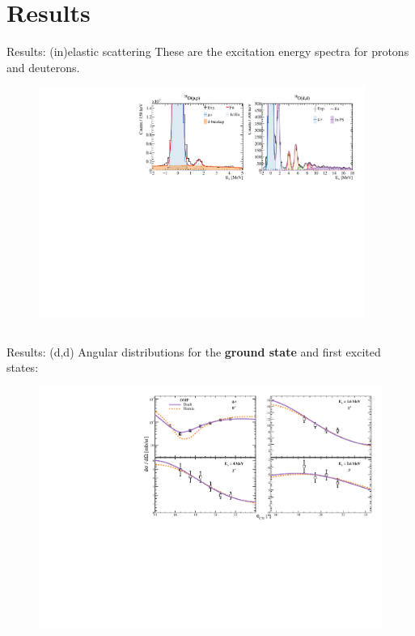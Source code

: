 \documentclass[aspectratio=43, dvipsnames]{beamer}
\newcommand{\iso}[2]{\ce{^{#1}#2}}
\begin{document}
\section{Results}
\begin{frame}{Results: (in)elastic scattering}
	These are the excitation energy spectra for protons and deuterons.
	\begin{figure}
		\includegraphics[width=0.95\textwidth]{figures/elastic_xs.pdf}
	\end{figure}
	\begin{columns}[c]
		\begin{column}{0.45\linewidth}
		\end{column}%
		\begin{column}{0.45\linewidth}
		\end{column}
	\end{columns}
\end{frame}

\begin{frame}{Results: \iso{20}{O}(d,d)}
	Angular distributions for the \textbf{ground state} and first excited states:
	\begin{figure}
		\includegraphics[width=0.85\linewidth]{figures/d_ang.pdf}
	\end{figure}
\end{frame}
\end{document}
